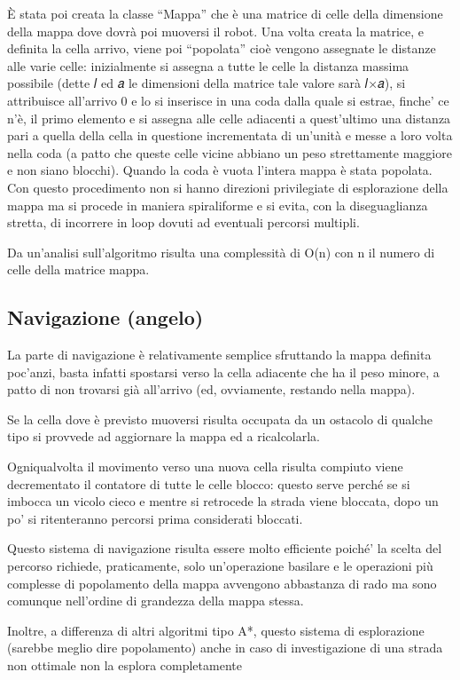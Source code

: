 \documentclass[english]{article}
\begin{document}
È stata poi creata la classe “Mappa” che è una matrice di celle della dimensione della mappa dove dovrà poi muoversi il robot. Una volta creata la matrice, e definita la cella arrivo, viene poi “popolata” cioè vengono assegnate le distanze alle varie celle: inizialmente si assegna a tutte le celle la distanza massima possibile (dette 𝑙 ed 𝑎 le dimensioni della matrice tale valore sarà 𝑙×𝑎), si attribuisce all’arrivo 0 e lo si inserisce in una coda dalla quale si estrae, finche’ ce n’è, il primo elemento e si assegna alle celle adiacenti a quest’ultimo una distanza pari a quella della cella in questione incrementata di un’unità e messe a loro volta nella coda (a patto che queste celle vicine abbiano un peso strettamente maggiore e non siano blocchi). Quando la coda è vuota l’intera mappa è stata popolata. Con questo procedimento non si hanno direzioni privilegiate di esplorazione della mappa ma si procede in maniera spiraliforme e si evita, con la diseguaglianza stretta, di incorrere in loop dovuti ad eventuali percorsi multipli.

Da un’analisi sull’algoritmo risulta una complessità di O(n) con n il numero di celle della matrice mappa.

\subsection{Navigazione (angelo)}
La parte di navigazione è relativamente semplice sfruttando la mappa definita poc’anzi, basta infatti spostarsi verso la cella adiacente che ha il peso minore, a patto di non trovarsi già all’arrivo (ed, ovviamente, restando nella mappa).

Se la cella dove è previsto muoversi risulta occupata da un ostacolo di qualche tipo si provvede ad aggiornare la mappa ed a ricalcolarla.

Ogniqualvolta il movimento verso una nuova cella risulta compiuto viene decrementato il contatore di tutte le celle blocco: questo serve perché se si imbocca un vicolo cieco e mentre si retrocede la strada viene bloccata, dopo un po’ si ritenteranno percorsi prima considerati bloccati.

Questo sistema di navigazione risulta essere molto efficiente poiché’ la scelta del percorso richiede, praticamente, solo un’operazione basilare e le operazioni più complesse di popolamento della mappa avvengono abbastanza di rado ma sono comunque nell’ordine di grandezza della mappa stessa.

Inoltre, a differenza di altri algoritmi tipo A*, questo sistema di esplorazione (sarebbe meglio dire popolamento) anche in caso di investigazione di una strada non ottimale non la esplora completamente
\end{document}

